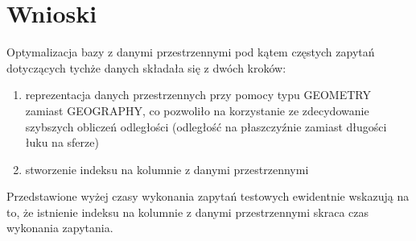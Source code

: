 \documentclass[11pt,a4paper]{article}
\begin{document}
\section{Wnioski}
Optymalizacja bazy z danymi przestrzennymi pod kątem częstych zapytań dotyczących tychże danych składała się z dwóch kroków:
\begin{enumerate}
	\item reprezentacja danych przestrzennych przy pomocy typu GEOMETRY zamiast GEOGRAPHY, co pozwoliło na korzystanie ze zdecydowanie szybszych obliczeń odległości (odległość na płaszczyźnie zamiast długości łuku na sferze)
	\item stworzenie indeksu na kolumnie z danymi przestrzennymi
\end{enumerate}
Przedstawione wyżej czasy wykonania zapytań testowych ewidentnie wskazują na to, że istnienie indeksu na kolumnie z danymi przestrzennymi skraca czas wykonania zapytania.
\end{document}

